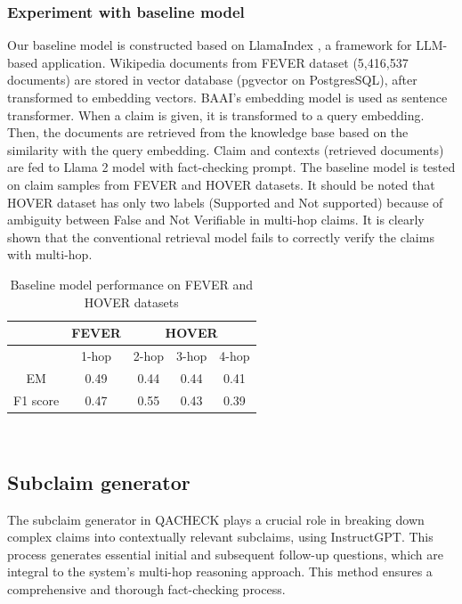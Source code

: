 \documentclass{article}
\begin{document}
\subsubsection*{Experiment with baseline model}
Our baseline model is constructed based on LlamaIndex \cite{LlamaIndex}, a framework for LLM-based application. Wikipedia documents from FEVER dataset (5,416,537 documents) are stored in vector database (pgvector on PostgresSQL), after transformed to embedding vectors. BAAI’s embedding model \cite{bge_embedding} is used as sentence transformer. When a claim is given, it is transformed to a query embedding. Then, the documents are retrieved from the knowledge base based on the similarity with the query embedding. Claim and contexts (retrieved documents) are fed to Llama 2 \cite{touvron2023llama} model with fact-checking prompt. The baseline model is tested on claim samples from FEVER and HOVER datasets. It should be noted that HOVER dataset has only two labels (Supported and Not supported) because of ambiguity between False and Not Verifiable in multi-hop claims. It is clearly shown that the conventional retrieval model fails to correctly verify the claims with multi-hop.

\begin{table}[h]
  \centering
  \begin{tabular}{c|c|ccc}
  \toprule
           & FEVER & \multicolumn{3}{c}{HOVER} \\ \midrule
           & 1-hop & 2-hop   & 3-hop  & 4-hop  \\ \midrule
  EM       & 0.49  & 0.44    & 0.44   & 0.41   \\
  F1 score & 0.47  & 0.55    & 0.43   & 0.39   \\ \bottomrule
  \end{tabular}\\[5pt]
  \caption{Baseline model performance on FEVER and HOVER datasets}
\end{table}

\subsection{Subclaim generator}
The subclaim generator in QACHECK plays a crucial role in breaking down complex claims into contextually relevant subclaims, using InstructGPT. This process generates essential initial and subsequent follow-up questions, which are integral to the system's multi-hop reasoning approach. This method ensures a comprehensive and thorough fact-checking process.
\end{document}
